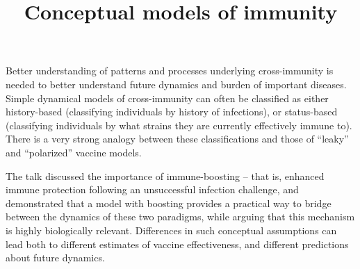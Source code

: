 
\title{Conceptual models of immunity}

Better understanding of patterns and processes underlying
cross-immunity is needed to better understand future dynamics and
burden of important diseases. Simple dynamical models of
cross-immunity can often be classified as either history-based
(classifying individuals by history of infections), or status-based
(classifying individuals by what strains they are currently
effectively immune to). There is a very strong analogy between these
classifications and those of “leaky” and “polarized” vaccine models.

The talk discussed the importance of immune-boosting – that is,
enhanced immune protection following an unsuccessful infection
challenge, and demonstrated that a model with boosting provides a
practical way to bridge between the dynamics of these two paradigms,
while arguing that this mechanism is highly biologically relevant.
Differences in such conceptual assumptions can lead both to different
estimates of vaccine effectiveness, and different predictions about
future dynamics.
